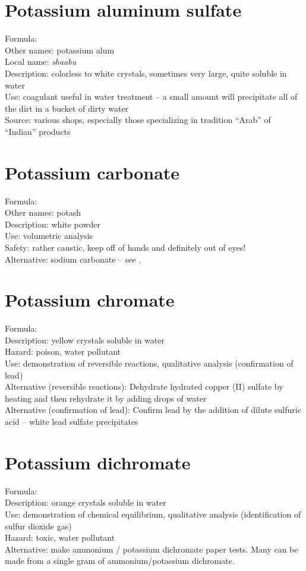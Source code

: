 \section{Potassium aluminum sulfate}
\label{sec:potalsulf}
Formula: \\
Other names: potassium alum\\
Local name: \textit{shaabu}\\
Description: colorless to white crystals, 
sometimes very large, 
quite soluble in water\\
Use: coagulant useful in water treatment -- 
a small amount will precipitate all of the dirt in a bucket of dirty water\\
Source: various shops, 
especially those specializing in tradition ``Arab'' of ``Indian'' products

\section{Potassium carbonate}
\label{sec:}
Formula: \\
Other names: potash\\
Description: white powder\\
Use: volumetric analysis\\
Safety: rather caustic, keep off of hands and definitely out of eyes!\\
Alternative: sodium carbonate -- 
see .

\section{Potassium chromate}
\label{sec:}
Formula: \\
Description: yellow crystals soluble in water\\
Hazard: poison, 
water pollutant\\
Use: demonstration of reversible reactions, 
qualitative analysis (confirmation of lead)\\
Alternative (reversible reactions):
Dehydrate hydrated copper (II) sulfate by heating 
and then rehydrate it by adding drops of water\\
Alternative (confirmation of lead): 
Confirm lead by the addition of dilute sulfuric acid -- 
white lead sulfate precipitates

\section{Potassium dichromate}
\label{sec:}
Formula: \\
Description: orange crystals soluble in water\\
Use: demonstration of chemical equilibrium, 
qualitative analysis (identification of sulfur dioxide gas)\\
Hazard: toxic, 
water pollutant\\
Alternative: make ammonium / potassium dichromate paper tests. 
Many can be made from a single gram of ammonium/potassium dichromate.

